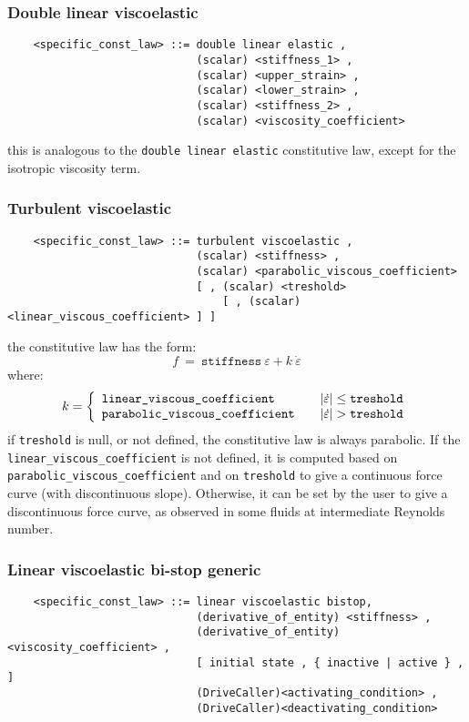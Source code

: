 \subsubsection{Double linear viscoelastic}
\begin{verbatim}
    <specific_const_law> ::= double linear elastic ,
                             (scalar) <stiffness_1> ,
                             (scalar) <upper_strain> ,
                             (scalar) <lower_strain> ,
                             (scalar) <stiffness_2> ,
                             (scalar) <viscosity_coefficient>
\end{verbatim}
this is analogous to the \texttt{double linear elastic} constitutive law,
except for the isotropic viscosity term.
  
\subsubsection{Turbulent viscoelastic}
\begin{verbatim}
    <specific_const_law> ::= turbulent viscoelastic ,
                             (scalar) <stiffness> ,
                             (scalar) <parabolic_viscous_coefficient>
                             [ , (scalar) <treshold> 
                                 [ , (scalar) <linear_viscous_coefficient> ] ]
\end{verbatim}
the constitutive law has the form:
\begin{displaymath}
    f \ = \ \texttt{stiffness} \ \varepsilon + k \ \dot{\varepsilon}
\end{displaymath}
where:
\begin{displaymath}
    k = \lcubr{\matr{lcr}{
        \texttt{linear\_viscous\_coefficient} & & 
            \shbr{\dot{\varepsilon}} \leq \texttt{treshold} \\
        \texttt{parabolic\_viscous\_coefficient} & &
            \shbr{\dot{\varepsilon}} > \texttt{treshold}
    }}
\end{displaymath}
if \texttt{treshold} is null, or not defined, the constitutive law is always
parabolic. If the \texttt{linear\_viscous\_coefficient} is not defined, it is
computed based on \texttt{parabolic\_viscous\_coefficient} and on 
\texttt{treshold} to give a continuous force curve (with discontinuous slope).
Otherwise, it can be set by the user to give a discontinuous force curve,
as observed in some fluids at intermediate Reynolds number.

\subsubsection{Linear viscoelastic bi-stop generic}
\begin{verbatim}
    <specific_const_law> ::= linear viscoelastic bistop,
                             (derivative_of_entity) <stiffness> ,
                             (derivative_of_entity) <viscosity_coefficient> ,
                             [ initial state , { inactive | active } , ]
                             (DriveCaller)<activating_condition> ,
                             (DriveCaller)<deactivating_condition>
\end{verbatim}
  
